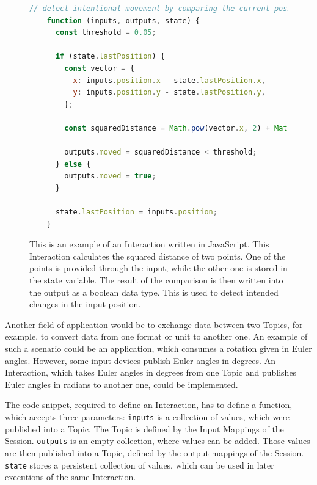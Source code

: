 \begin{figure}[H]
	\begin{lstlisting}[language=JavaScript]
    // detect intentional movement by comparing the current position with a previous one
    function (inputs, outputs, state) {
      const threshold = 0.05;

      if (state.lastPosition) {
        const vector = {
          x: inputs.position.x - state.lastPosition.x,
          y: inputs.position.y - state.lastPosition.y,
        };

        const squaredDistance = Math.pow(vector.x, 2) + Math.pow(vector.y, 2);

        outputs.moved = squaredDistance < threshold;
      } else {
        outputs.moved = true;
      }

      state.lastPosition = inputs.position;
    }
  \end{lstlisting}
	\caption[Basic UBII Interaction in JavaScript]{This is an example of an Interaction written in JavaScript. This Interaction calculates the squared distance of two points. One of the points is provided through the input, while the other one is stored in the state variable. The result of the comparison is then written into the output as a boolean data type. This is used to detect intended changes in the input position.}\label{fig:ubii-interaction-example}
\end{figure}

Another field of application would be to exchange data between two Topics, for example, to convert data from one format or unit to another one. An example of such a scenario could be an application, which consumes a rotation given in Euler angles. However, some input devices publish Euler angles in degrees. An Interaction, which takes Euler angles in degrees from one Topic and publishes Euler angles in radians to another one, could be implemented.

The code snippet, required to define an Interaction, has to define a function, which accepts three parameters:
\lstinline{inputs} is a collection of values, which were published into a Topic. The Topic is defined by the Input Mappings of the Session. \lstinline{outputs} is an empty collection, where values can be added. Those values are then published into a Topic, defined by the output mappings of the Session. \lstinline{state} stores a persistent collection of values, which can be used in later executions of the same Interaction.